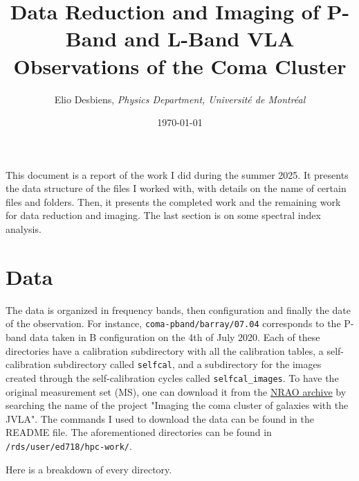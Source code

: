 \documentclass[11pt,letterpaper]{article}
\title{\textbf{Data Reduction and Imaging of P-Band and L-Band VLA Observations of the Coma Cluster}}
\author{
    Elio Desbiens, \textit{Physics Department, Université de Montréal}\\
}
\date{\today}
\begin{document}
\maketitle


\begin{onecolabstract}
This document is a report of the work I did during the summer 2025. It presents the data structure of the files I worked with, with details on the name of certain files and folders. Then, it presents the completed work and the remaining work for data reduction and imaging. The last section is on some spectral index analysis. 

\noindent 

\vspace{4mm} %
\end{onecolabstract}
\section{Data}
The data is organized in frequency bands, then configuration and finally the date of the observation. For instance, \verb|coma-pband/barray/07.04| corresponds to the P-band data taken in B configuration on the 4th of July 2020. Each of these directories have a calibration subdirectory with all the calibration tables, a self-calibration subdirectory called \verb|selfcal|, and a subdirectory for the images created through the self-calibration cycles called \verb|selfcal_images|. To have the original measurement set (MS), one can download it from the \href{https://data.nrao.edu/portal/#/}{NRAO archive} by searching the name of the project "Imaging the coma cluster of galaxies with the JVLA". The commands I used to download the data can be found in the README file. The aforementioned directories can be found in \verb|/rds/user/ed718/hpc-work/|.
\medskip
\par Here is a breakdown of every directory.
\end{document}
